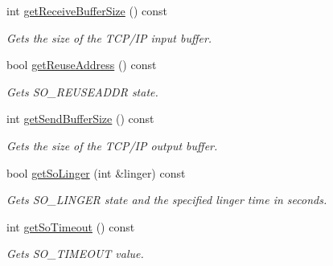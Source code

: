 \begin{DoxyCompactItemize}
\mbox{\label{classcppu_1_1_socket_a2058e95277c8db85c9ceb3794dc52fd4}} 
int \mbox{\hyperlink{classcppu_1_1_socket_a2058e95277c8db85c9ceb3794dc52fd4}{get\+Receive\+Buffer\+Size}} () const
\begin{DoxyCompactList}\small\item\em Gets the size of the T\+C\+P/\+IP input buffer. \end{DoxyCompactList}\item 
\mbox{\label{classcppu_1_1_socket_a67b90a17ea69d3a94763d9e12eba0255}} 
bool \mbox{\hyperlink{classcppu_1_1_socket_a67b90a17ea69d3a94763d9e12eba0255}{get\+Reuse\+Address}} () const
\begin{DoxyCompactList}\small\item\em Gets S\+O\+\_\+\+R\+E\+U\+S\+E\+A\+D\+DR state. \end{DoxyCompactList}\item 
\mbox{\label{classcppu_1_1_socket_ab36efcea3c1d709e95a83fcd4a36af7c}} 
int \mbox{\hyperlink{classcppu_1_1_socket_ab36efcea3c1d709e95a83fcd4a36af7c}{get\+Send\+Buffer\+Size}} () const
\begin{DoxyCompactList}\small\item\em Gets the size of the T\+C\+P/\+IP output buffer. \end{DoxyCompactList}\item 
\mbox{\label{classcppu_1_1_socket_ae9feee18305bbfb565180b1e7509329d}} 
bool \mbox{\hyperlink{classcppu_1_1_socket_ae9feee18305bbfb565180b1e7509329d}{get\+So\+Linger}} (int \&linger) const
\begin{DoxyCompactList}\small\item\em Gets S\+O\+\_\+\+L\+I\+N\+G\+ER state and the specified linger time in seconds. \end{DoxyCompactList}\item 
\mbox{\label{classcppu_1_1_socket_a2ce0bce7a0ad0ea37b9c8b9a3b261662}} 
int \mbox{\hyperlink{classcppu_1_1_socket_a2ce0bce7a0ad0ea37b9c8b9a3b261662}{get\+So\+Timeout}} () const
\begin{DoxyCompactList}\small\item\em Gets S\+O\+\_\+\+T\+I\+M\+E\+O\+UT value. \end{DoxyCompactList}\item 

\end{DoxyCompactItemize}
